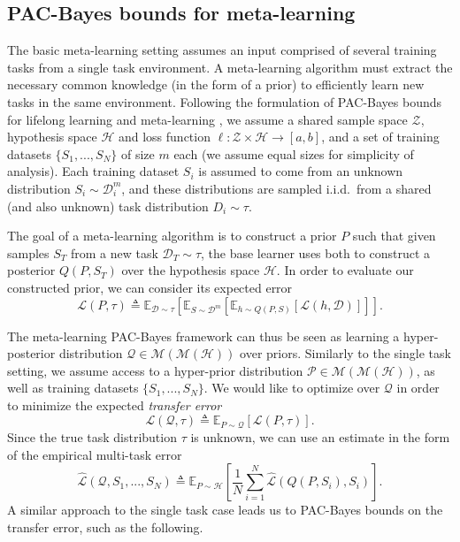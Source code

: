 \documentclass{article} %
\theoremstyle{definition}
\newcommand{\Expect}[2]{\mathbb{E}_{#1}\left [#2 \right ]}
\begin{document}
\subsection{PAC-Bayes bounds for meta-learning} \label{sec:meta}

The basic meta-learning setting assumes an input comprised of several training tasks from a single task environment. A meta-learning algorithm must extract the necessary common knowledge (in the form of a prior) to efficiently learn new tasks in the same environment. Following the formulation of PAC-Bayes bounds for lifelong learning \citep{Pentina2014} and meta-learning \citep{Amit2018}, we assume a shared sample space $\mathcal{Z}$, hypothesis space $\mathcal{H}$ and loss function $\ell:\mathcal{Z}\times \mathcal{H}\rightarrow [a,b]$, and a set of training datasets $\{S_1,...,S_N\}$ of size $m$ each (we assume equal sizes for simplicity of analysis). Each training dataset $S_i$ is assumed to come from an unknown distribution $S_i\sim \mathcal{D}^m_i$, and these distributions are sampled i.i.d.\ from a shared (and also unknown) task distribution $D_i\sim \tau$.

The goal of a meta-learning algorithm is to construct a prior $P$ such that given samples $S_T$ from a new task $\mathcal{D}_T\sim \tau$, the base learner uses both to construct a posterior $Q(P, S_T)$ over the hypothesis space $\mathcal{H}$. In order to evaluate our constructed prior, we can consider its expected error
%
\begin{equation}
\mathcal{L}(P, \tau)\triangleq \Expect{\mathcal{D}\sim \tau}{\Expect{S\sim \mathcal{D}^m}{\Expect{h\sim Q(P, S)}{\mathcal{L}(h, \mathcal{D})}}} .
\end{equation}
%

%
The meta-learning PAC-Bayes framework can thus be seen as learning a hyper-posterior distribution $\mathcal{Q}\in \mathcal{M}(\mathcal{M}(\mathcal{H}))$ over priors. Similarly to the single task setting, we assume access to a hyper-prior distribution $\mathcal{P}\in \mathcal{M}(\mathcal{M}(\mathcal{H}))$, as well as training datasets $\{S_1,...,S_N\}$.
We would like to optimize over $\mathcal{Q}$ in order to minimize the expected \emph{transfer error} 
$$
\mathcal{L}(\mathcal{Q}, \tau) \triangleq \Expect{P\sim \mathcal{Q}}{\mathcal{L}(P, \tau)} .
$$
Since the true task distribution $\tau$ is unknown, we can use an estimate in the form of the empirical multi-task error $$\hat{\mathcal{L}}(\mathcal{Q}, S_1,...,S_N)\triangleq \Expect{P\sim \mathcal{H}}{\frac{1}{N}\sum_{i=1}^{N}\hat{\mathcal{L}}(Q(P, S_i), S_i)} .$$
A similar approach to the single task case leads us to PAC-Bayes bounds on the transfer error, such as the following.
\end{document}
